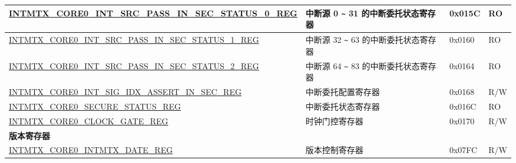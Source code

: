 \begin{longtable}{ | p{10cm} | p{10cm} | p{1.3cm} | p{1cm} | }
\hyperref[regdesc:INTMTXCORE0SRCPASSINSECSTATUS0REG]{INTMTX\_CORE0\_INT\_SRC\_PASS\_IN\_SEC\_STATUS\_0\_REG} & 中断源 0 \verb+~+ 31 的中断委托状态寄存器 & 0x015C & RO \\ \hline
\hyperref[regdesc:INTMTXCORE0SRCPASSINSECSTATUS1REG]{INTMTX\_CORE0\_INT\_SRC\_PASS\_IN\_SEC\_STATUS\_1\_REG} & 中断源 32 \verb+~+ 63 的中断委托状态寄存器 & 0x0160 & RO \\ \hline
\hyperref[regdesc:INTMTXCORE0SRCPASSINSECSTATUS2REG]{INTMTX\_CORE0\_INT\_SRC\_PASS\_IN\_SEC\_STATUS\_2\_REG} & 中断源 64 \verb+~+ 83 的中断委托状态寄存器 & 0x0164 & RO \\ \hline
\hyperref[regdesc:INTMTXCORE0INTSIGIDXASSERTINSECREG]{INTMTX\_CORE0\_INT\_SIG\_IDX\_ASSERT\_IN\_SEC\_REG} & 中断委托配置寄存器 & 0x0168 & R/W \\ \hline
\hyperref[regdesc:INTMTXCORE0SECURESTATUSREG]{INTMTX\_CORE0\_SECURE\_STATUS\_REG} & 中断委托状态寄存器 & 0x016C & RO \\ \hline
\hyperref[regdesc:INTMTXCORE0CLOCKGATEREG]{INTMTX\_CORE0\_CLOCK\_GATE\_REG} & 时钟门控寄存器 & 0x0170 & R/W \\ \hline
\multicolumn{4}{|l|}{\textbf{版本寄存器}} \\ \hline
\hyperref[regdesc:INTMTXCORE0INTMTXDATEREG]{INTMTX\_CORE0\_INTMTX\_DATE\_REG} & 版本控制寄存器 & 0x07FC & R/W \\ \hline
\end{longtable}
